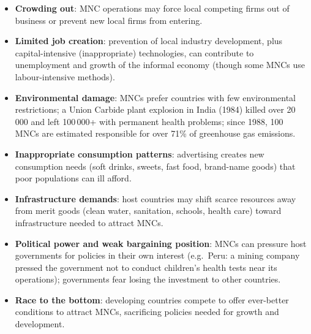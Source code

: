 \begin{itemize}
\begin{itemize}
    \item \textbf{Crowding out}: MNC operations may force local competing firms out of business or prevent new local firms from entering.
    \item \textbf{Limited job creation}: prevention of local industry development, plus capital-intensive (inappropriate) technologies, can contribute to unemployment and growth of the informal economy (though some MNCs use labour-intensive methods).
    \item \textbf{Environmental damage}: MNCs prefer countries with few environmental restrictions; a Union Carbide plant explosion in India (1984) killed over 20\,000 and left 100\,000+ with permanent health problems; since 1988, 100 MNCs are estimated responsible for over 71\% of greenhouse gas emissions.
    \item \textbf{Inappropriate consumption patterns}: advertising creates new consumption needs (soft drinks, sweets, fast food, brand-name goods) that poor populations can ill afford.
    \item \textbf{Infrastructure demands}: host countries may shift scarce resources away from merit goods (clean water, sanitation, schools, health care) toward infrastructure needed to attract MNCs.
    \item \textbf{Political power and weak bargaining position}: MNCs can pressure host governments for policies in their own interest (e.g.\ Peru: a mining company pressed the government not to conduct children's health tests near its operations); governments fear losing the investment to other countries.
    \item \textbf{Race to the bottom}: developing countries compete to offer ever-better conditions to attract MNCs, sacrificing policies needed for growth and development.
  \end{itemize}
\end{itemize}

